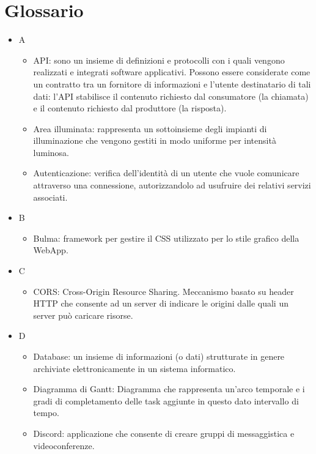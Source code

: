 \documentclass[12pt]{article}
\begin{document}
\section{Glossario}
\begin{itemize}
    \item[] A
    \begin{itemize}
        \item API: sono un insieme di definizioni e protocolli con i quali vengono realizzati e integrati software applicativi. Possono essere considerate come un contratto tra un fornitore di informazioni e l'utente destinatario di tali dati: l'API stabilisce il contenuto richiesto dal consumatore (la chiamata) e il contenuto richiesto dal produttore (la risposta).
        \item Area illuminata: rappresenta un sottoinsieme degli impianti di illuminazione che vengono gestiti in modo uniforme per intensità luminosa.
        \item Autenticazione: verifica dell'identità di un utente che vuole comunicare attraverso una connessione, autorizzandolo ad usufruire dei relativi servizi associati.
    \end{itemize}
    \item[] B
    \begin{itemize}
        \item Bulma: framework per gestire il CSS utilizzato per lo stile grafico della WebApp.
    \end{itemize}
    \item[] C
    \begin{itemize}
        \item CORS: Cross-Origin Resource Sharing. Meccanismo basato su header HTTP che consente ad un server di indicare le origini dalle quali un server può caricare risorse.
    \end{itemize}
    \item[] D
    \begin{itemize}
        \item Database: un insieme di informazioni (o dati) strutturate in genere archiviate elettronicamente in un sistema informatico.
        \item Diagramma di Gantt: Diagramma che rappresenta un'arco temporale e i gradi di completamento delle task aggiunte in questo dato intervallo di tempo.
        \item Discord: applicazione che consente di creare gruppi di messaggistica e videoconferenze.
    \end{itemize}

\end{itemize}
\end{document}
